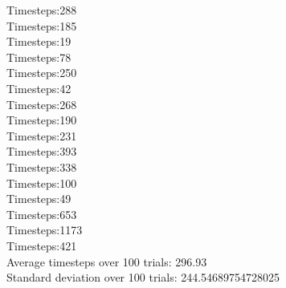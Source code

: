 \documentclass{article}
\begin{document}
Timesteps:288\\
Timesteps:185\\
Timesteps:19\\
Timesteps:78\\
Timesteps:250\\
Timesteps:42\\
Timesteps:268\\
Timesteps:190\\
Timesteps:231\\
Timesteps:393\\
Timesteps:338\\
Timesteps:100\\
Timesteps:49\\
Timesteps:653\\
Timesteps:1173\\
Timesteps:421\\
Average timesteps over 100 trials: 296.93\\
Standard deviation over 100 trials: 244.54689754728025\\
\end{document}
